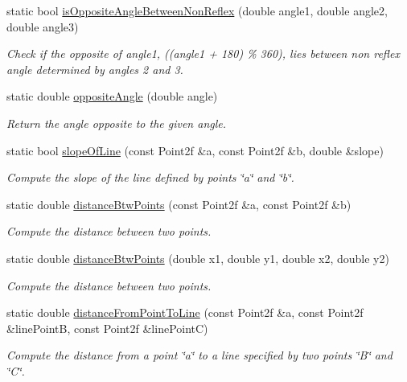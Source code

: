 \begin{DoxyCompactItemize}
static bool \hyperlink{classmultiscale_1_1Geometry2D_a28d74085708bba7fa68fbea05d0d51ad}{is\-Opposite\-Angle\-Between\-Non\-Reflex} (double angle1, double angle2, double angle3)
\begin{DoxyCompactList}\small\item\em Check if the opposite of angle1, ((angle1 + 180) \% 360), lies between non reflex angle determined by angles 2 and 3. \end{DoxyCompactList}\item 
static double \hyperlink{classmultiscale_1_1Geometry2D_a3bb85fa2797ba25765f0f57786cb33ef}{opposite\-Angle} (double angle)
\begin{DoxyCompactList}\small\item\em Return the angle opposite to the given angle. \end{DoxyCompactList}\item 
static bool \hyperlink{classmultiscale_1_1Geometry2D_a1219ac10c3647d43c5af77dc5bc574a2}{slope\-Of\-Line} (const Point2f \&a, const Point2f \&b, double \&slope)
\begin{DoxyCompactList}\small\item\em Compute the slope of the line defined by points \char`\"{}a\char`\"{} and \char`\"{}b\char`\"{}. \end{DoxyCompactList}\item 
static double \hyperlink{classmultiscale_1_1Geometry2D_a911b35d7abde99988bb4b43f00d6be72}{distance\-Btw\-Points} (const Point2f \&a, const Point2f \&b)
\begin{DoxyCompactList}\small\item\em Compute the distance between two points. \end{DoxyCompactList}\item 
static double \hyperlink{classmultiscale_1_1Geometry2D_a0b01b51c41789623f2cd7a0a2a66f462}{distance\-Btw\-Points} (double x1, double y1, double x2, double y2)
\begin{DoxyCompactList}\small\item\em Compute the distance between two points. \end{DoxyCompactList}\item 
static double \hyperlink{classmultiscale_1_1Geometry2D_ae6c0f66accf4ecf31b0fd96437371626}{distance\-From\-Point\-To\-Line} (const Point2f \&a, const Point2f \&line\-Point\-B, const Point2f \&line\-Point\-C)
\begin{DoxyCompactList}\small\item\em Compute the distance from a point \char`\"{}a\char`\"{} to a line specified by two points \char`\"{}\-B\char`\"{} and \char`\"{}\-C\char`\"{}. \end{DoxyCompactList}\item 

\end{DoxyCompactItemize}
